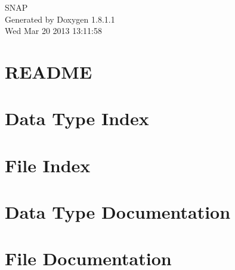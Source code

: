 \documentclass{book}
\begin{document}
\hypersetup{pageanchor=false,citecolor=blue}
\begin{titlepage}
\vspace*{7cm}
\begin{center}
{\Large S\-N\-A\-P }\\
\vspace*{1cm}
{\large Generated by Doxygen 1.8.1.1}\\
\vspace*{0.5cm}
{\small Wed Mar 20 2013 13:11:58}\\
\end{center}
\end{titlepage}
\clearemptydoublepage
{}
\tableofcontents
\clearemptydoublepage
{}
\hypersetup{pageanchor=true,citecolor=blue}
\chapter{R\-E\-A\-D\-M\-E}
\label{md_README}
\hypertarget{md_README}{}

\chapter{Data Type Index}

\chapter{File Index}

\chapter{Data Type Documentation}



























\chapter{File Documentation}

























\printindex
\end{document}
